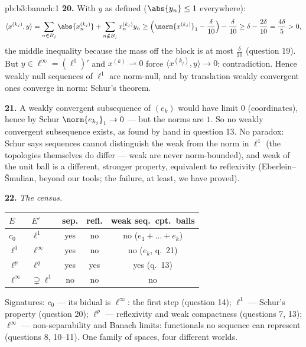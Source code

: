 \begin{solution}{pb:b3:banach:1}
\textbf{20.} With $y$ as defined ($\abs{y_n} \leq 1$
everywhere):
\[
\langle x^{(k_j)}, y\rangle
= \sum_{n \in B_j}\abs{x^{(k_j)}_n}
+ \sum_{n \notin B_j}x^{(k_j)}_ny_n
\geq \Bigl(\norm{x^{(k_j)}}_1 - \frac\delta{10}\Bigr) -
\frac\delta{10}
\geq \delta - \frac{2\delta}{10} = \frac{4\delta}5 > 0,
\]
the middle inequality because the mass off the block is at
most $\frac\delta{10}$ (question 19). But $y \in
\ell^\infty = (\ell^1)'$ and $x^{(k)} \rightharpoonup 0$
force $\langle x^{(k_j)}, y\rangle \to 0$: contradiction.
Hence weakly null sequences of $\ell^1$ are norm-null, and by
translation weakly convergent ones converge in norm: Schur's
theorem.

\textbf{21.} A weakly convergent subsequence of $(e_k)$ would
have limit $0$ (coordinates), hence by Schur $\norm{e_{k_j}}_1
\to 0$ --- but the norms are $1$. So no weakly convergent
subsequence exists, as found by hand in question 13. No
paradox: Schur says sequences cannot distinguish the weak
from the norm  in $\ell^1$ (the topologies themselves
do differ --- weak  are never norm-bounded), and
weak  of the unit ball is a different,
stronger property, equivalent to reflexivity
(Eberlein--\v Smulian, beyond our tools; the failure, at
least, we have proved).

\textbf{22.} \emph{The census.}
\begin{center}
\begin{tabular}{l|l|c|c|c}
$E$ & $E'$ & sep. & refl. & weak seq.\ cpt.\ balls\\
\hline
$c_0$ & $\ell^1$ & yes & no & no ($e_1{+}\dots{+}e_k$)\\
$\ell^1$ & $\ell^\infty$ & yes & no & no ($e_k$, q.~21)\\
$\ell^p$ & $\ell^q$ & yes & yes & yes (q.~13)\\
$\ell^\infty$ & $\supsetneq\ell^1$ & no & no & no\\
\end{tabular}
\end{center}
Signatures: $c_0$ --- its bidual is $\ell^\infty$: the first
 step (question 14); $\ell^1$ --- Schur's
property (question 20); $\ell^p$ --- reflexivity and weak
compactness (questions 7, 13); $\ell^\infty$ ---
non-separability and Banach limits: functionals no sequence
can represent (questions 8, 10--11). One family of spaces,
four different worlds.


\end{solution}
